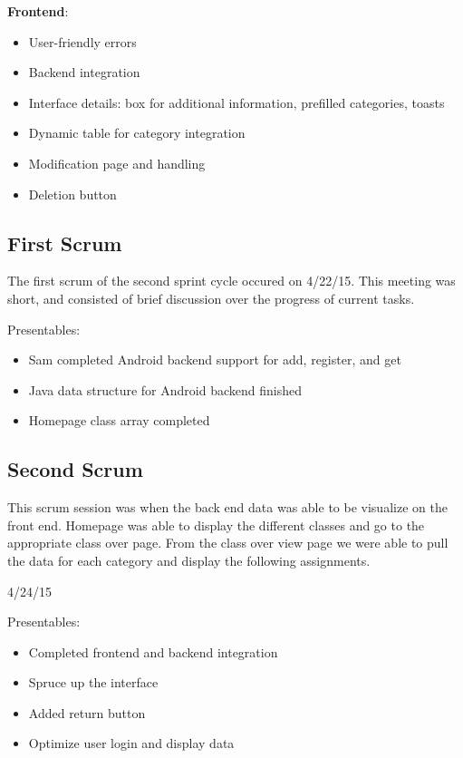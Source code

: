 \documentclass[a4paper]{article} %
\begin{document}
\textbf{Frontend}:
\begin{itemize}
  \item User-friendly errors
    \item Backend integration
    \item Interface details: box for additional information, prefilled categories, toasts
    \item Dynamic table for category integration
    \item Modification page and handling
    \item Deletion button
\end{itemize}

\subsection{First Scrum}

The first scrum of the second sprint cycle occured on 4/22/15. This meeting was short, and consisted of brief discussion over the progress of current tasks.

Presentables: 

\begin{itemize}
  \item Sam completed Android backend support for add, register, and get 
    \item Java data structure for Android backend finished
    \item Homepage class array completed
\end{itemize}

\subsection{Second Scrum}

This scrum session was when the back end data was able to be visualize on the front end. Homepage was able to display the different classes and go to the appropriate class over page. From the class over view page we were able to pull the data for each category and display the following assignments. 


4/24/15

Presentables: 

\begin{itemize}
  \item Completed frontend and backend integration
    \item Spruce up the interface
    \item Added return button
    \item Optimize user login and display data
\end{itemize}
\end{document}
